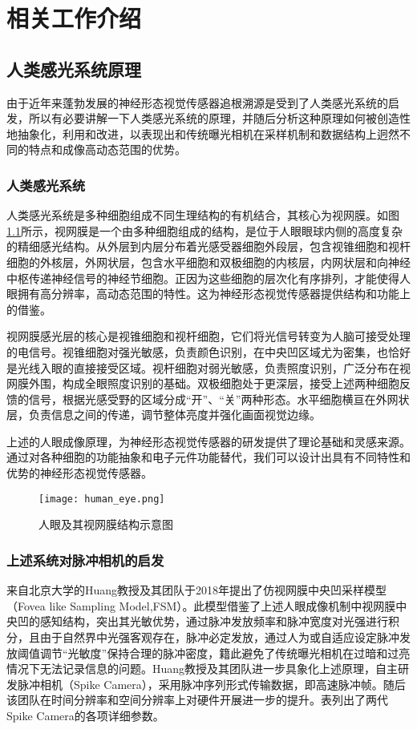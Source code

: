 \chapter{相关工作介绍}

\section{人类感光系统原理}
由于近年来蓬勃发展的神经形态视觉传感器追根溯源是受到了人类感光系统的启发，所以有必要讲解一下人类感光系统的原理，并随后分析这种原理如何被创造性地抽象化，利用和改进，以表现出和传统曝光相机在采样机制和数据结构上迥然不同的特点和成像高动态范围的优势。
\subsection{人类感光系统}
人类感光系统是多种细胞组成不同生理结构的有机结合，其核心为视网膜。如图\ref{fig:human_eye}所示，视网膜是一个由多种细胞组成的结构，是位于人眼眼球内侧的高度复杂的精细感光结构。从外层到内层分布着光感受器细胞外段层，包含视锥细胞和视杆细胞的外核层，外网状层，包含水平细胞和双极细胞的内核层，内网状层和向神经中枢传递神经信号的神经节细胞。正因为这些细胞的层次化有序排列，才能使得人眼拥有高分辨率，高动态范围的特性。这为神经形态视觉传感器提供结构和功能上的借鉴。

视网膜感光层的核心是视锥细胞和视杆细胞，它们将光信号转变为人脑可接受处理的电信号。视锥细胞对强光敏感，负责颜色识别，在中央凹区域尤为密集，也恰好是光线入眼的直接接受区域。视杆细胞对弱光敏感，负责照度识别，广泛分布在视网膜外围，构成全眼照度识别的基础。双极细胞处于更深层，接受上述两种细胞反馈的信号，根据光感受野的区域分成“开”、“关”两种形态。水平细胞横亘在外网状层，负责信息之间的传递，调节整体亮度并强化画面视觉边缘。

上述的人眼成像原理，为神经形态视觉传感器的研发提供了理论基础和灵感来源。通过对各种细胞的功能抽象和电子元件功能替代，我们可以设计出具有不同特性和优势的神经形态视觉传感器。
\begin{figure}[ht]
  \centering
  \texttt{[image: human\_eye.png]}
  \caption{人眼及其视网膜结构示意图}
  \label{fig:human_eye}
\end{figure}


\subsection{上述系统对脉冲相机的启发}
来自北京大学的Huang教授及其团队于2018年提出了仿视网膜中央凹采样模型（Fovea like Sampling Model,FSM）\cite{7923720}。此模型借鉴了上述人眼成像机制中视网膜中央凹的感知结构，突出其光敏优势，通过脉冲发放频率和脉冲宽度对光强进行积分，且由于自然界中光强客观存在，脉冲必定发放，通过人为或自适应设定脉冲发放阈值调节“光敏度”保持合理的脉冲密度，籍此避免了传统曝光相机在过暗和过亮情况下无法记录信息的问题。Huang教授及其团队进一步具象化上述原理，自主研发脉冲相机（Spike Camera），采用脉冲序列\cite{dong2018spike}形式传输数据，即高速脉冲帧。随后该团队在时间分辨率和空间分辨率上对硬件开展进一步的提升。表列出了两代Spike Camera的各项详细参数。

